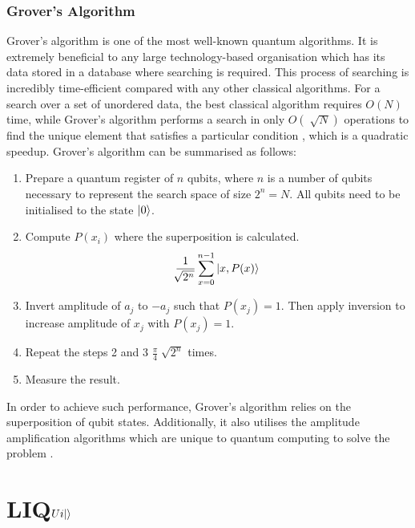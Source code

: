 \documentclass[12pt]{third-rep}
\begin{document}
\subsection{Grover's Algorithm}
Grover's algorithm is one of the most well-known quantum algorithms. It is extremely beneficial to any large technology-based organisation which has its data stored in a database where searching is required. This process of searching is incredibly time-efficient compared with any other classical algorithms. For a search over a set of unordered data, the best classical algorithm requires $O(N)$ time, while Grover's algorithm performs a search in only $O(\sqrt[]{N})$ operations to find the unique element that satisfies a particular condition \cite{umass}, which is a quadratic speedup. Grover's algorithm can be summarised as follows:
\begin{enumerate}
\item Prepare a quantum register of $n$ qubits, where $n$ is a number of qubits necessary to represent the search space of size $2^n=N$. All qubits need to be initialised to the state ${\left\vert{0}\right\rangle}$.
\item Compute $P(x_i)$ where the superposition is calculated.
$$\frac{1}{\sqrt[]{2^n}}\sum_{x=0}^{n-1}{\left\vert{x,P(x)}\right\rangle}$$
\item Invert amplitude of $a_j$ to $-a_j$ such that $P(x_j)=1$. Then apply inversion to increase amplitude of $x_j$ with $P(x_j)=1$.
\item Repeat the steps 2 and 3 $\frac{\pi}{4}\sqrt[]{2^n}$ times.
\item Measure the result.
\end{enumerate}
In order to achieve such performance, Grover's algorithm relies on the superposition of qubit states. Additionally, it also utilises the amplitude amplification algorithms which are unique to quantum computing to solve the problem \cite{umass}.

\begingroup
\renewcommand{\cleardoublepage}{}
\renewcommand{\clearpage}{}
\chapter{LIQ$Ui{\left\vert{}\right\rangle}$}
\endgroup
\end{document}
